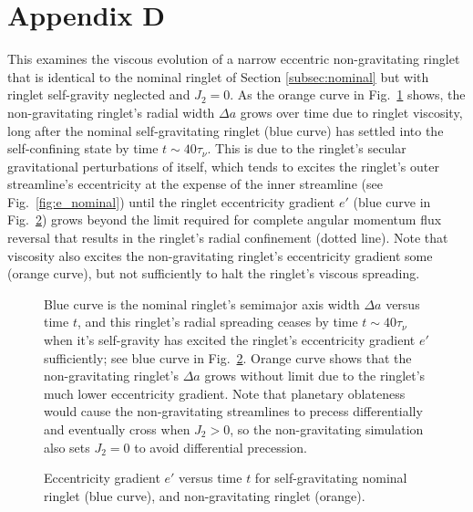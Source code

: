 \documentclass[preprint]{aastex62}
\begin{document}
\section{Appendix D}
\label{sec:Appendix D}

This examines the viscous evolution of a narrow eccentric non-gravitating
ringlet that is identical to the nominal ringlet of Section \ref{subsec:nominal} but
with ringlet self-gravity neglected and $J_2=0$.
As the orange curve in Fig.\ \ref{fig:da_nogravity} shows, the non-gravitating ringlet's
radial width $\Delta a$ grows over time due to ringlet viscosity, 
long after the nominal self-gravitating ringlet (blue curve)
has settled into the self-confining state by time $t\sim40\tau_\nu$. This is due to the
ringlet's secular gravitational perturbations of itself,
which tends to excites the ringlet's outer streamline's eccentricity at the expense
of the inner streamline (see Fig.\ \ref{fig:e_nominal}) until the ringlet eccentricity gradient $e'$
(blue curve in Fig.\ \ref{fig:de_prime_nogravity}) grows beyond the
limit required for complete angular momentum flux reversal 
that results in the ringlet's radial confinement (dotted line). 
Note that viscosity also excites the non-gravitating
ringlet's eccentricity gradient some (orange curve), but not sufficiently to halt the ringlet's 
viscous spreading.

\begin{figure}
    \caption{
        \label{fig:da_nogravity}
        Blue curve is the nominal ringlet's semimajor axis width $\Delta a$ versus time $t$,
        and this ringlet's radial spreading ceases by time $t\sim40\tau_\nu$ when it's self-gravity
        has excited the ringlet's eccentricity gradient $e'$ sufficiently; 
        see blue curve in Fig.\ \ref{fig:de_prime_nogravity}. Orange curve shows that
        the non-gravitating ringlet's $\Delta a$ grows without limit due to the ringlet's
        much lower eccentricity gradient. Note that planetary oblateness would
        cause the non-gravitating streamlines to precess differentially and eventually cross
        when $J_2>0$, so the non-gravitating simulation also sets $J_2=0$ 
        to avoid differential precession.
    }
\end{figure}

\begin{figure}
    \caption{
        \label{fig:de_prime_nogravity}
        Eccentricity gradient $e'$ versus time $t$ for self-gravitating nominal ringlet (blue curve),
        and non-gravitating ringlet (orange).
    }
\end{figure}



\end{document}

